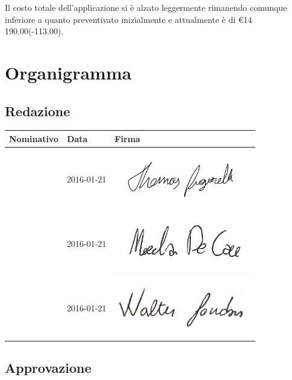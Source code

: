 \documentclass[12pt,a4paper]{article}
\begin{document}
\par Il costo totale dell'applicazione si è alzato leggermente rimanendo comunque inferiore a quanto preventivato inizialmente e attualmente è di \euro{}14 190.00(-113.00).

\newpage

\appendix
\section{Organigramma}

\subsection{Redazione}

\begin{table}[H]
	\begin{center}
		\begin{tabular}{l l l}
			\toprule
            \textbf{Nominativo}	& \textbf{Data} & \textbf{Firma} \\ \midrule
			\midrule
            \TP{} & 2016-01-21 & \includegraphics[width=6cm]{../img/firmaPigarelli.png} \\ \midrule
            \NDC{} & 2016-01-21 & \includegraphics[width=6cm]{../img/firmaDeCao.png} \\ \midrule
			\WS{} & 2016-01-21 & \includegraphics[width=6cm]{../img/firmaSandon.png} \\
			\bottomrule
		\end{tabular}
	\end{center}
\end{table}

\subsection{Approvazione}
\end{document}
